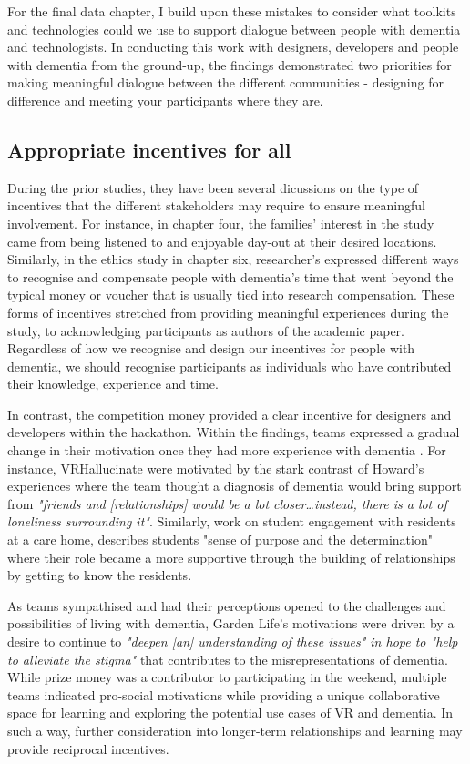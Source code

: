 For the final data chapter, I build upon these mistakes to consider what toolkits and technologies could we use to support dialogue between people with dementia and technologists. In conducting this work with designers, developers and people with dementia from the ground-up, the findings demonstrated two priorities for making meaningful dialogue between the different communities - designing for difference and meeting your participants where they are.

\subsection{Appropriate incentives for all}
\label{RQ4:Incentives}
During the prior studies, they have been several dicussions on the type of incentives that the different stakeholders may require to ensure meaningful involvement. For instance, in chapter four, the families' interest in the study came from being listened to and enjoyable day-out at their desired locations. Similarly, in the ethics study in chapter six, researcher's expressed different ways to recognise and compensate people with dementia's time that went beyond the typical money or voucher that is usually tied into research compensation. These forms of incentives stretched from providing meaningful experiences during the study, to acknowledging participants as authors of the academic paper. Regardless of how we recognise and design our incentives for people with dementia, we should recognise participants as individuals who have contributed their knowledge, experience and time.  

In contrast, the competition money provided a clear incentive for designers and developers within the hackathon. Within the findings, teams expressed a gradual change in their motivation once they had more experience with dementia \citep{gama2017crowdsourced}. For instance, VRHallucinate were motivated by the stark contrast of Howard's experiences where the team thought a diagnosis of dementia would bring support from \textit{"friends and [relationships] would be a lot closer…instead, there is a lot of loneliness surrounding it"}. Similarly, \citep{foley_student_2020} work on student engagement with residents at a care home, describes students "sense of purpose and the determination" where their role became a more supportive through the building of relationships by getting to know the residents.  

As teams sympathised and had their perceptions opened to the challenges and possibilities of living with dementia, Garden Life's motivations were driven by a desire to continue to \textit{"deepen [an] understanding of these issues" in hope to "help to alleviate the stigma"} that contributes to the misrepresentations of dementia. While prize money was a contributor to participating in the weekend, multiple teams indicated pro-social motivations while providing a unique collaborative space for learning and exploring the potential use cases of VR and dementia. In such a way, further consideration into longer-term relationships and learning may provide reciprocal incentives. 

